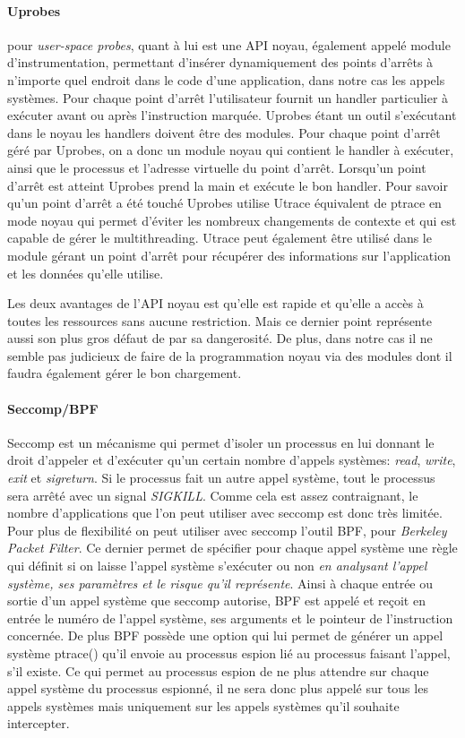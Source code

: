 \paragraph{Uprobes}\cite{INTERCEPTION:AS, INTERCEPTION:MARION}
pour \textit{user-space probes}, quant à lui est une API noyau, également appelé
module d'instrumentation, permettant d'insérer dynamiquement des points d'arrêts
à n'importe quel endroit dans le code d'une application, dans notre cas les
appels systèmes. Pour chaque point d'arrêt l’utilisateur fournit un handler
particulier à exécuter avant ou après l’instruction marquée. Uprobes étant un
outil s'exécutant dans le noyau les handlers doivent être des modules. Pour
chaque point d'arrêt géré par Uprobes, on a donc un module noyau qui contient le
handler à exécuter, ainsi que le processus et l'adresse virtuelle du point
d'arrêt. Lorsqu'un point d'arrêt est atteint Uprobes prend la main et exécute le
bon handler. Pour savoir qu'un point d'arrêt a été touché Uprobes utilise Utrace
équivalent de ptrace en mode noyau qui permet d'éviter les nombreux changements
de contexte et qui est capable de gérer le multithreading. Utrace peut également
être utilisé dans le module gérant un point d'arrêt pour récupérer des
informations sur l'application et les données qu'elle utilise.

Les deux avantages de l'API noyau est qu'elle est rapide et qu'elle a accès à
toutes les ressources sans aucune restriction. Mais ce dernier point représente
aussi son plus gros défaut de par sa dangerosité. De plus, dans notre cas il ne
semble pas judicieux de faire de la programmation noyau via des modules dont il
faudra également gérer le bon chargement.

\paragraph{Seccomp/BPF}\cite{INTERCEPTION:seccomp_bpf}
Seccomp est un mécanisme qui permet d'isoler un processus en lui donnant le
droit d'appeler et d'exécuter qu'un certain nombre d'appels systèmes:
\textit{read}, \textit{write}, \textit{exit} et \textit{sigreturn}. Si le
processus fait un autre appel système, tout le processus sera arrêté avec un
signal \textit{SIGKILL}. Comme cela est assez contraignant, le nombre
d'applications que l'on peut utiliser avec seccomp est donc très limitée. Pour
plus de flexibilité on peut utiliser avec seccomp l'outil BPF, pour
\textit{Berkeley Packet Filter}. Ce dernier permet de spécifier pour chaque
appel système une règle qui définit si on laisse l'appel système s'exécuter ou
non \textit{en analysant l'appel système, ses paramètres et le risque qu'il
  représente}. Ainsi à chaque entrée ou sortie d'un appel système que seccomp
autorise, BPF est appelé et reçoit en entrée le numéro de l'appel système, ses
arguments et le pointeur de l'instruction concernée. De plus BPF possède une
option qui lui permet de générer un appel système ptrace() qu'il envoie au
processus espion lié au processus faisant l'appel, s'il existe. Ce qui permet au
processus espion de ne plus attendre sur chaque appel système du processus
espionné, il ne sera donc plus appelé sur tous les appels systèmes mais
uniquement sur les appels systèmes qu'il souhaite intercepter.

